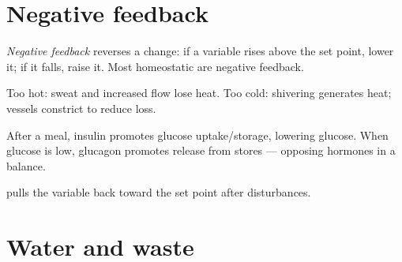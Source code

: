 \section{Negative feedback}

\begin{definition}\label{def:g9:homeostasis:neg}
\emph{Negative feedback} reverses a change:
if a variable rises above the set point,  lower it; if it falls,
 raise it. Most homeostatic  are negative feedback.
\end{definition}

\begin{example}\label{ex:g9:homeostasis:temp}
Too hot: sweat and increased   flow lose heat. Too cold:
shivering generates heat;  vessels constrict to reduce loss.
\end{example}

\begin{example}\label{ex:g9:homeostasis:glu}
After a meal, insulin promotes glucose uptake/storage, lowering 
glucose. When glucose is low, glucagon promotes release from stores ---
opposing hormones in a balance.
\end{example}

\begin{omfigure}

{\small {} pulls the variable back toward the set point
after disturbances.}
\end{omfigure}

\section{Water and waste}

